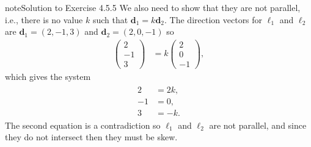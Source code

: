 \documentclass[letterpaper,10pt,english]{jupyterBook}
\begin{document}
\begin{sphinxadmonition}{note}{Solution to Exercise 4.5.5}
\sphinxAtStartPar
We also need to show that they are not parallel, i.e., there is no value \(k\) such that \(\mathbf{d}_1 = k \mathbf{d}_2\). The direction vectors for \(\ell_1\) and \(\ell_2\) are \(\mathbf{d}_1 = (2, -1, 3)\) and \(\mathbf{d}_2 = (2, 0, -1)\) so
\begin{equation*}
\begin{split} \begin{pmatrix} 2 \\ -1 \\ 3 \end{pmatrix} &= k \begin{pmatrix} 2 \\ 0 \\ -1 \end{pmatrix}, \end{split}
\end{equation*}
\sphinxAtStartPar
which gives the system
\begin{equation*}
\begin{split} \begin{align*}
    2 &= 2k ,\\
    -1 &= 0, \\
    3 &= -k.
\end{align*} \end{split}
\end{equation*}
\sphinxAtStartPar
The second equation is a contradiction so \(\ell_1\) and \(\ell_2\) are not parallel, and since they do not intersect then they must be skew.


\end{sphinxadmonition}
\end{document}
